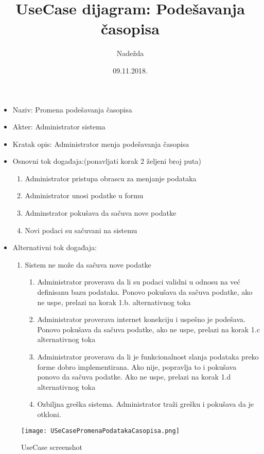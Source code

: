 \documentclass[a4paper]{article}
\title{UseCase dijagram: Podešavanja časopisa}
\date{09.11.2018.}
\author{Nadežda}
\begin{document}
\maketitle
\newpage

\begin{itemize}
    \item Naziv: Promena podešavanja časopisa
    \item Akter: Administrator sistema
    \item Kratak opis: Administrator menja podešavanja časopisa
    \item Osnovni tok događaja:(ponavljati korak 2 željeni broj puta)
        \begin{enumerate}
            \item Administrator pristupa obrascu za menjanje podataka
            \item Administrator unosi podatke u formu
            \item Adminstrator pokušava da sačuva nove podatke
            \item Novi podaci su sačuvani na sistemu
        \end{enumerate}
    \item Alternativni tok događaja:
        \begin{enumerate}
            \item Sistem ne može da sačuva nove podatke
                \begin{enumerate}
                    \item Administrator proverava da li su podaci validni u odnosu na već definisanu bazu podataka. Ponovo pokušava da sačuva podatke, ako ne uspe, prelazi na korak 1.b. alternativnog toka 
                    \item Administrator proverava internet konekciju i uspešno je podešava. Ponovo pokušava da sačuva podatke, ako ne uspe, prelazi na korak 1.c alternativnog toka
                    \item Administrator proverava da li je funkcionalnost slanja podataka preko forme dobro implementirana. Ako nije, popravlja to i pokušava ponovo da sačuva podatke. Ako ne uspe, prelazi na korak 1.d alternativnog toka
                    \item Ozbiljna greška sistema. Administrator traži grešku i pokušava da je otkloni.
                \end{enumerate}
        \end{enumerate}
\end{itemize}

\begin{figure}
    \centering
    \texttt{[image: USeCasePromenaPodatakaCasopisa.png]}
    \caption{UseCase screenshot}
    \label{fig:my_label}
\end{figure}
\end{document}
